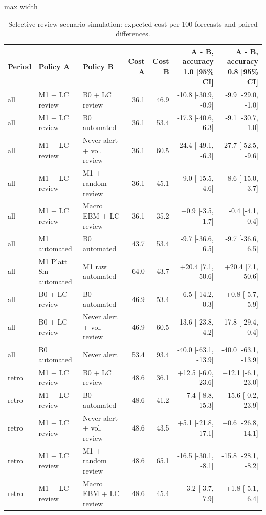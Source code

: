 \documentclass[preprint,12pt,authoryear]{elsarticle}
\begin{document}
\begin{table}[!htbp]
\centering
\scriptsize
\setlength{\tabcolsep}{3pt}
\caption{Selective-review scenario simulation: expected cost per 100 forecasts and paired differences.}
\label{tab:review}
\begin{adjustbox}{max width=\textwidth}
\begin{tabular}{lllrrrr}
\toprule
Period & Policy A & Policy B & Cost A & Cost B & A - B, accuracy 1.0 [95\% CI] & A - B, accuracy 0.8 [95\% CI] \\
\midrule
all & M1 + LC review & B0 + LC review & 36.1 & 46.9 & -10.8 [-30.9, -0.9] & -9.9 [-29.0, -1.0] \\
all & M1 + LC review & B0 automated & 36.1 & 53.4 & -17.3 [-40.6, -6.3] & -9.1 [-30.7, 1.0] \\
all & M1 + LC review & Never alert + vol. review & 36.1 & 60.5 & -24.4 [-49.1, -6.3] & -27.7 [-52.5, -9.6] \\
all & M1 + LC review & M1 + random review & 36.1 & 45.1 & -9.0 [-15.5, -4.6] & -8.6 [-15.0, -3.7] \\
all & M1 + LC review & Macro EBM + LC review & 36.1 & 35.2 & +0.9 [-3.5, 1.7] & -0.4 [-4.1, 0.4] \\
all & M1 automated & B0 automated & 43.7 & 53.4 & -9.7 [-36.6, 6.5] & -9.7 [-36.6, 6.5] \\
all & M1 Platt 8m automated & M1 raw automated & 64.0 & 43.7 & +20.4 [7.1, 50.6] & +20.4 [7.1, 50.6] \\
all & B0 + LC review & B0 automated & 46.9 & 53.4 & -6.5 [-14.2, -0.3] & +0.8 [-5.7, 5.9] \\
all & B0 + LC review & Never alert + vol. review & 46.9 & 60.5 & -13.6 [-23.8, 4.2] & -17.8 [-29.4, 0.4] \\
all & B0 automated & Never alert & 53.4 & 93.4 & -40.0 [-63.1, -13.9] & -40.0 [-63.1, -13.9] \\
retro & M1 + LC review & B0 + LC review & 48.6 & 36.1 & +12.5 [-6.0, 23.6] & +12.1 [-6.1, 23.0] \\
retro & M1 + LC review & B0 automated & 48.6 & 41.2 & +7.4 [-8.8, 15.3] & +15.6 [-0.2, 23.9] \\
retro & M1 + LC review & Never alert + vol. review & 48.6 & 43.5 & +5.1 [-21.8, 17.1] & +0.6 [-26.8, 14.1] \\
retro & M1 + LC review & M1 + random review & 48.6 & 65.1 & -16.5 [-30.1, -8.1] & -15.8 [-28.1, -8.2] \\
retro & M1 + LC review & Macro EBM + LC review & 48.6 & 45.4 & +3.2 [-3.7, 7.9] & +1.8 [-5.1, 6.4] \\

\end{tabular}
\end{adjustbox}
\end{table}
\end{document}
